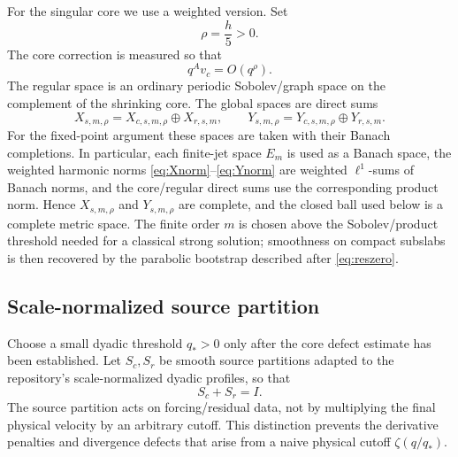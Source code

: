 \documentclass[11pt]{article}
\numberwithin{equation}{section}
\begin{document}
For the singular core we use a weighted version.  Set
\begin{equation}
\rho=\frac h5>0.
\label{eq:rho}
\end{equation}
The core correction is measured so that
\begin{equation}
q^A v_c=O(q^\rho).
\label{eq:coreweight}
\end{equation}
The regular space is an ordinary periodic Sobolev/graph space on the complement of the shrinking core.  The global spaces are direct sums
\begin{equation}
X_{s,m,\rho}=X_{c,s,m,\rho}\oplus X_{r,s,m},
\qquad
Y_{s,m,\rho}=Y_{c,s,m,\rho}\oplus Y_{r,s,m}.
\label{eq:globalspaces}
\end{equation}
For the fixed-point argument these spaces are taken with their Banach completions.  In particular, each finite-jet space \(E_m\) is used as a Banach space, the weighted harmonic norms \eqref{eq:Xnorm}--\eqref{eq:Ynorm} are weighted \(\ell^1\)-sums of Banach norms, and the core/regular direct sums use the corresponding product norm.  Hence \(X_{s,m,\rho}\) and \(Y_{s,m,\rho}\) are complete, and the closed ball used below is a complete metric space.  The finite order \(m\) is chosen above the Sobolev/product threshold needed for a classical strong solution; smoothness on compact subslabs is then recovered by the parabolic bootstrap described after \eqref{eq:reszero}.

\subsection{Scale-normalized source partition}
Choose a small dyadic threshold \(q_*>0\) only after the core defect estimate has been established.  Let \(S_c,S_r\) be smooth source partitions adapted to the repository's scale-normalized dyadic profiles, so that
\begin{equation}
S_c+S_r=I.
\label{eq:partition}
\end{equation}
The source partition acts on forcing/residual data, not by multiplying the final physical velocity by an arbitrary cutoff.  This distinction prevents the derivative penalties and divergence defects that arise from a naive physical cutoff \(\zeta(q/q_*)\).
\end{document}
